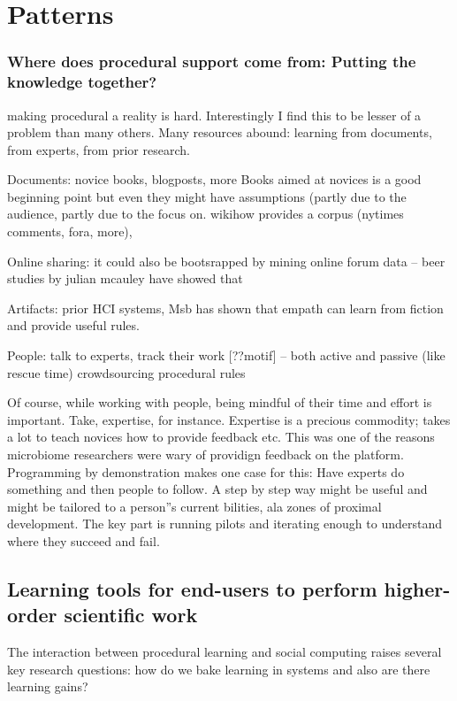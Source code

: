 \section{Patterns} 


\subsubsection{Where does procedural support come from: Putting the knowledge together?}
making procedural a reality is hard. Interestingly I find this to be lesser of a problem than many others. Many resources abound: learning from documents, from experts, from prior research. 

Documents: novice books, blogposts, more
Books aimed at novices is a good beginning point but even they might have assumptions (partly due to the audience, partly due to the focus on. wikihow provides a corpus
 (nytimes comments, fora, more),  

Online sharing: it could also be bootsrapped by mining online forum data -- beer studies by julian mcauley have showed that 

Artifacts: prior HCI systems, Msb has shown that empath can learn from fiction and provide useful rules. 

People: talk to experts, track their work [??motif] -- both active and passive (like rescue time)
crowdsourcing procedural rules

Of course, while working with people, being mindful of their time and effort is important. Take, expertise, for instance. Expertise is a precious commodity; takes a lot to teach novices how to provide feedback etc. This was one of the reasons microbiome researchers were wary of providign feedback on the platform. Programming by demonstration makes one case for this: Have experts do something and then people to follow. A step by step way might be useful and might be tailored to a person''s current bilities, ala zones of proximal development.
The key part is running pilots and iterating enough to understand where they succeed and fail. 

\subsection{Learning tools for end-users to perform higher-order scientific work}
The interaction between procedural learning and social computing raises several key research questions: how do we bake learning in systems and also are there learning gains?

